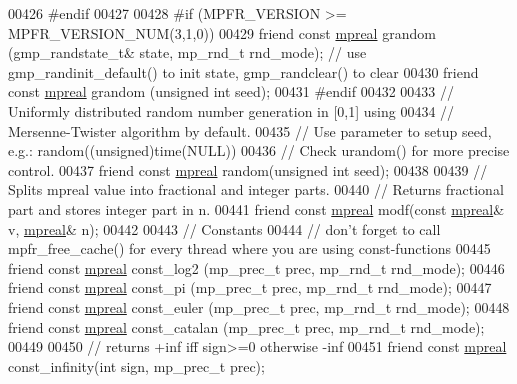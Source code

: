 \begin{DoxyCode}
00426 \textcolor{preprocessor}{#endif}
00427 
00428 \textcolor{preprocessor}{#if (MPFR\_VERSION >= MPFR\_VERSION\_NUM(3,1,0))}
00429     \textcolor{keyword}{friend} \textcolor{keyword}{const} \hyperlink{classmpfr_1_1mpreal}{mpreal} grandom (gmp\_randstate\_t& state, mp\_rnd\_t rnd\_mode);     \textcolor{comment}{// use
       gmp\_randinit\_default() to init state, gmp\_randclear() to clear}
00430     \textcolor{keyword}{friend} \textcolor{keyword}{const} \hyperlink{classmpfr_1_1mpreal}{mpreal} grandom (\textcolor{keywordtype}{unsigned} \textcolor{keywordtype}{int} seed);
00431 \textcolor{preprocessor}{#endif}
00432 
00433     \textcolor{comment}{// Uniformly distributed random number generation in [0,1] using}
00434     \textcolor{comment}{// Mersenne-Twister algorithm by default.}
00435     \textcolor{comment}{// Use parameter to setup seed, e.g.: random((unsigned)time(NULL))}
00436     \textcolor{comment}{// Check urandom() for more precise control.}
00437     \textcolor{keyword}{friend} \textcolor{keyword}{const} \hyperlink{classmpfr_1_1mpreal}{mpreal} random(\textcolor{keywordtype}{unsigned} \textcolor{keywordtype}{int} seed);
00438 
00439     \textcolor{comment}{// Splits mpreal value into fractional and integer parts.}
00440     \textcolor{comment}{// Returns fractional part and stores integer part in n.}
00441     \textcolor{keyword}{friend} \textcolor{keyword}{const} \hyperlink{classmpfr_1_1mpreal}{mpreal} modf(\textcolor{keyword}{const} \hyperlink{classmpfr_1_1mpreal}{mpreal}& v, \hyperlink{classmpfr_1_1mpreal}{mpreal}& n);
00442 
00443     \textcolor{comment}{// Constants}
00444     \textcolor{comment}{// don't forget to call mpfr\_free\_cache() for every thread where you are using const-functions}
00445     \textcolor{keyword}{friend} \textcolor{keyword}{const} \hyperlink{classmpfr_1_1mpreal}{mpreal} const\_log2      (mp\_prec\_t prec, mp\_rnd\_t rnd\_mode);
00446     \textcolor{keyword}{friend} \textcolor{keyword}{const} \hyperlink{classmpfr_1_1mpreal}{mpreal} const\_pi        (mp\_prec\_t prec, mp\_rnd\_t rnd\_mode);
00447     \textcolor{keyword}{friend} \textcolor{keyword}{const} \hyperlink{classmpfr_1_1mpreal}{mpreal} const\_euler     (mp\_prec\_t prec, mp\_rnd\_t rnd\_mode);
00448     \textcolor{keyword}{friend} \textcolor{keyword}{const} \hyperlink{classmpfr_1_1mpreal}{mpreal} const\_catalan   (mp\_prec\_t prec, mp\_rnd\_t rnd\_mode);
00449 
00450     \textcolor{comment}{// returns +inf iff sign>=0 otherwise -inf}
00451     \textcolor{keyword}{friend} \textcolor{keyword}{const} \hyperlink{classmpfr_1_1mpreal}{mpreal} const\_infinity(\textcolor{keywordtype}{int} sign, mp\_prec\_t prec);

\end{DoxyCode}
